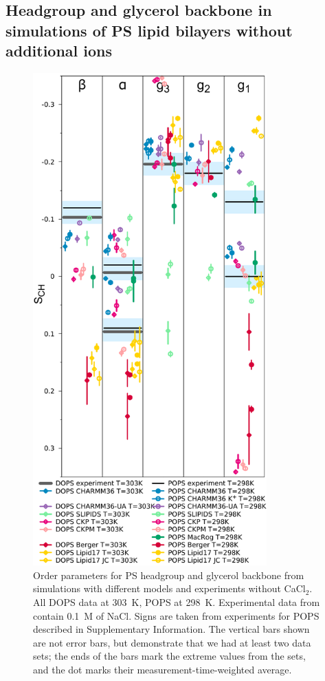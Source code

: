 \documentclass[aps,prl,superscriptaddress,twocolumn]{revtex4}
\begin{document}


\subsection{Headgroup and glycerol backbone in simulations of PS lipid bilayers without additional ions}
\begin{figure}[]
  \centering
  \includegraphics[width=9.0cm]{../Figs/HGorderparametersPS.pdf}
  \caption{\label{HGorderParametersPS}
    Order parameters for PS headgroup and glycerol
    backbone from simulations with different models and experiments without CaCl$_2$.
    All DOPS data at 303~K, POPS at 298~K.
    Experimental data from \cite{browning80} contain 0.1~M of NaCl.
    Signs are taken from experiments for POPS described in Supplementary Information.
    The vertical bars shown %
    are not error bars, but demonstrate that %
    we had at least two data sets; the ends of the bars mark the extreme values from the sets, and the dot marks their measurement-time-weighted average.
  }
\end{figure}
\end{document}
